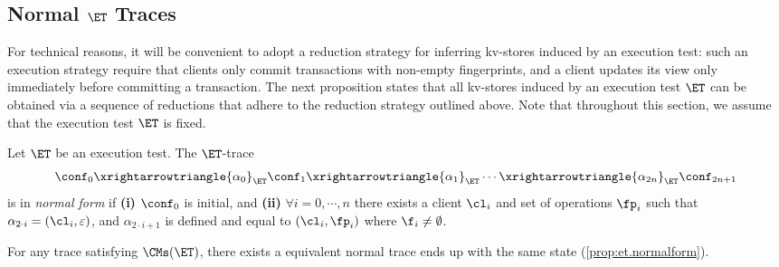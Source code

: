 \subsection{Normal \( \ET \) Traces}
\label{sec:normal-form-exist}
For technical reasons, it will be convenient to adopt a reduction strategy for inferring kv-stores induced by an 
execution test: such an execution strategy require that clients only commit transactions with non-empty fingerprints, 
and a client updates its view only immediately before committing a transaction. 
The next proposition states that all kv-stores induced by an execution test $\ET$ can be 
obtained via a sequence of reductions that adhere to the reduction strategy outlined above. 
Note that throughout this section, we assume that the execution test $\ET$ is fixed.

\begin{definition}
Let $\ET$ be an execution test. The $\ET$-trace
\[
\conf_0 \xrightarrowtriangle{\alpha_0}_{\ET} \conf_1 \xrightarrowtriangle{\alpha_1}_{\ET} \cdots \xrightarrowtriangle{\alpha_{2n}}_{\ET} \conf_{2n + 1}
\]
is in \emph{normal form} if \textbf{(i)} $\conf_0$ is initial, and 
\textbf{(ii)} $\forall i=0,\cdots, n$ there exists a client $\cl_i$ and set of operations $\fp_{i}$ such that 
$\alpha_{2 \cdot i} = (\cl_{i}, \varepsilon)$, and $\alpha_{2 \cdot i + 1}$ is defined and equal to $(\cl_{i}, \fp_{i})$ where \( \f_i \neq \emptyset \).
\end{definition}

For any trace satisfying \( \CMs(\ET) \), 
there exists a equivalent normal trace ends up with the same state (\cref{prop:et.normalform}).

